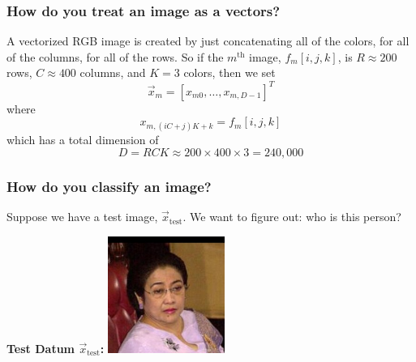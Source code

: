 \documentclass{beamer}
\begin{document}
\begin{frame}
  \frametitle{How do you treat an image as a vectors?}
  
  A vectorized RGB image is created by just concatenating all of the
  colors, for all of the columns, for all of the rows.  So if the
  $m^{\textrm{th}}$ image, $f_m[i,j,k]$, is $R\approx 200$ rows,
  $C\approx 400$ columns, and $K=3$ colors, then we set
  \[
  \vec{x}_m = [x_{m0},\ldots,x_{m,D-1}]^T
  \]
  where
  \[
  x_{m,(iC+j)K+k} = f_m[i,j,k]
  \]
  which has a total dimension of
  \[
  D=RCK \approx 200\times 400\times 3=240,000
  \]
\end{frame}
    

\begin{frame}
  \frametitle{How do you classify an image?}

  Suppose we have a test image, $\vec{x}_{\mbox{test}}$.  We want to figure out:
  who is this person?

  \begin{centering}
    \begin{block}{\bf Test Datum $\vec{x}_{\mbox{test}}$:}
      \includegraphics[width=1.5in]{Megawati_Sukarnoputri_0002.jpg}
    \end{block}
  \end{centering}
  
\end{frame}
    
\end{document}
